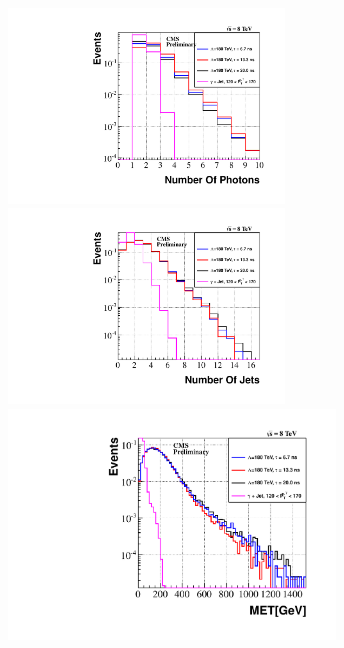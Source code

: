 \begin{minipage}{0.95\linewidth} 
\begin{center}
\mbox{\includegraphics[height=0.6\textwidth,width=0.55\textwidth]{THESISPLOTS/GMSB-SPS8-MODEL-NumberOfPhotons_Lambda-180TeV.pdf}%
\includegraphics[height=0.6\textwidth,width=0.55\textwidth]{THESISPLOTS/GMSB-SPS8-MODEL-NumberOfJets_Lambda-180TeV.pdf}} \\
\hspace{0.5cm}
\mbox{\includegraphics[height=0.55\textwidth,width=0.65\textwidth]{THESISPLOTS/GMSB-SPS8-MODEL-MET_Lambda-180TeV.pdf}}

\end{center}
\end{minipage}
